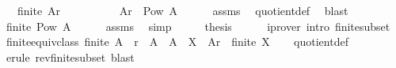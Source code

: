 \begin{isabellebody}
\ \ \ {\isachardoublequoteopen}finite\ {\isacharparenleft}{\kern0pt}A{\isacharslash}{\kern0pt}{\isacharslash}{\kern0pt}r{\isacharparenright}{\kern0pt}{\isachardoublequoteclose}\isanewline
\ \ \ \ %
\isanewline
%
\isadelimproof
%
\endisadelimproof
%
\isatagproof
{}\isamarkupfalse%
\ {\isacharminus}{\kern0pt}\isanewline
\ \ \isamarkupfalse%
\ {\isachardoublequoteopen}A{\isacharslash}{\kern0pt}{\isacharslash}{\kern0pt}r\ {\isasymsubseteq}\ Pow\ A{\isachardoublequoteclose}\isanewline
\ \ \ \ \isamarkupfalse%
\ assms\ \isamarkupfalse%
\ quotient{\isacharunderscore}{\kern0pt}def\ \isamarkupfalse%
\ blast\isanewline
\ \ \isamarkupfalse%
\ \isamarkupfalse%
\ {\isachardoublequoteopen}finite\ {\isacharparenleft}{\kern0pt}Pow\ A{\isacharparenright}{\kern0pt}{\isachardoublequoteclose}\isanewline
\ \ \ \ \isamarkupfalse%
\ assms\ \isamarkupfalse%
\ simp\isanewline
\ \ \isamarkupfalse%
\ \isamarkupfalse%
\ {\isacharquery}{\kern0pt}thesis\isanewline
\ \ \ \ \isamarkupfalse%
\ {\isacharparenleft}{\kern0pt}iprover\ intro{\isacharcolon}{\kern0pt}\ finite{\isacharunderscore}{\kern0pt}subset{\isacharparenright}{\kern0pt}\isanewline
{}\isamarkupfalse%
%
\endisatagproof
{\isafoldproof}%
%
\isadelimproof
\isanewline
%
\endisadelimproof
\isanewline
{}\isamarkupfalse%
\ finite{\isacharunderscore}{\kern0pt}equiv{\isacharunderscore}{\kern0pt}class{\isacharcolon}{\kern0pt}\ {\isachardoublequoteopen}finite\ A\ {\isasymLongrightarrow}\ r\ {\isasymsubseteq}\ A\ {\isasymtimes}\ A\ {\isasymLongrightarrow}\ X\ {\isasymin}\ A{\isacharslash}{\kern0pt}{\isacharslash}{\kern0pt}r\ {\isasymLongrightarrow}\ finite\ X{\isachardoublequoteclose}\isanewline
%
\isadelimproof
\ \ %
\endisadelimproof
%
\isatagproof
{}\isamarkupfalse%
\ quotient{\isacharunderscore}{\kern0pt}def\isanewline
\ \ \isamarkupfalse%
\ {\isacharparenleft}{\kern0pt}erule\ rev{\isacharunderscore}{\kern0pt}finite{\isacharunderscore}{\kern0pt}subset{\isacharparenright}{\kern0pt}\ blast%
\endisatagproof
{\isafoldproof}%
%
\isadelimproof
\isanewline
%
\endisadelimproof
\isanewline
{}\isamarkupfalse%

\end{isabellebody}
